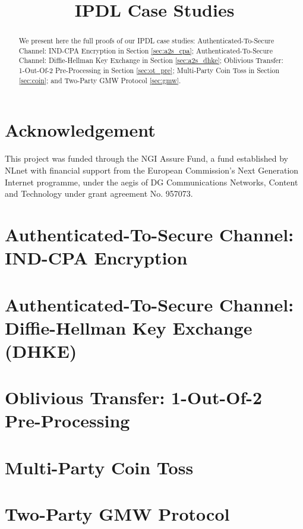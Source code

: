 \documentclass[11pt,hidelinks]{article}
\newcommand{\ipdl}{\textsf{IPDL} }
\begin{document}
\title{\ipdl Case Studies}

\maketitle

\begin{abstract}
We present here the full proofs of our \ipdl case studies: Authenticated-To-Secure Channel: IND-CPA Encryption in Section \ref{sec:a2s_cpa}; Authenticated-To-Secure Channel: Diffie-Hellman Key Exchange in Section \ref{sec:a2s_dhke}; Oblivious Transfer: 1-Out-Of-2 Pre-Processing in Section \ref{sec:ot_pre}; Multi-Party Coin Toss in Section \ref{sec:coin}; and Two-Party GMW Protocol \ref{sec:gmw}.
\end{abstract}

\section*{\small Acknowledgement}
This project was funded through the NGI Assure Fund, a fund established by NLnet with financial support from the European Commission's Next Generation Internet programme, under the aegis of DG Communications Networks, Content and Technology under grant agreement No. 957073.

\section{Authenticated-To-Secure Channel: IND-CPA Encryption}\label{sec:a2s_cpa}


\section{Authenticated-To-Secure Channel: Diffie-Hellman Key Exchange (DHKE)}\label{sec:a2s_dhke}


%

\section{Oblivious Transfer: 1-Out-Of-2 Pre-Processing}\label{sec:ot_pre}


\section{Multi-Party Coin Toss}\label{sec:coin}


\section{Two-Party GMW Protocol}\label{sec:gmw}

\end{document}
